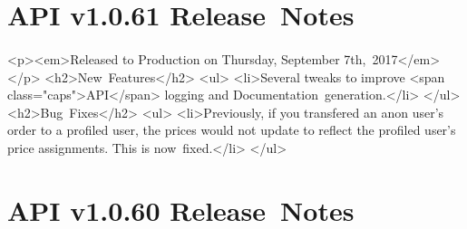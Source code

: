 \documentclass{memoir}%
\begin{document}
%
\section*{API v1.0.61 Release~Notes}%
\paragraph*{}%

%
\paragraph*{}%
<p><em>Released to Production on Thursday, September 7th,~2017</em></p>\newline%
<h2>New~Features</h2>\newline%
<ul>\newline%
<li>Several tweaks to improve <span class="caps">API</span> logging and Documentation~generation.</li>\newline%
</ul>\newline%
<h2>Bug~Fixes</h2>\newline%
<ul>\newline%
<li>Previously, if you transfered an anon user’s order to a profiled user, the prices would not update to reflect the profiled user’s price assignments. This is now~fixed.</li>\newline%
</ul>

%
\section*{API v1.0.60 Release~Notes}%
\paragraph*{}%

%
\end{document}
